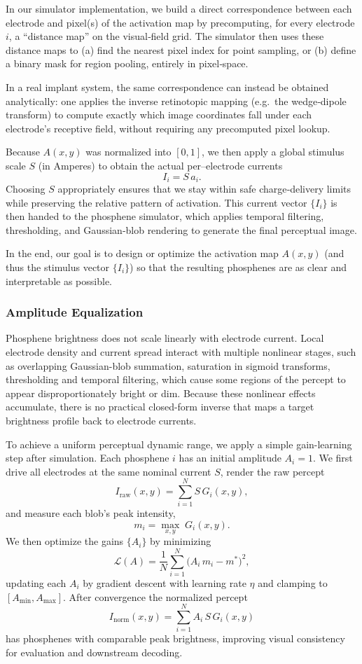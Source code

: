 In our simulator implementation, we build a direct correspondence between each electrode and pixel(s) of the activation map by precomputing, for every electrode \(i\), a “distance map” on the visual‐field grid.  The simulator then uses these distance maps to (a) find the nearest pixel index for point sampling, or (b) define a binary mask for region pooling, entirely in pixel‐space.  

In a real implant system, the same correspondence can instead be obtained analytically: one applies the inverse retinotopic mapping (e.g.\ the wedge‐dipole transform) to compute exactly which image coordinates fall under each electrode’s receptive field, without requiring any precomputed pixel lookup.

Because \(A(x,y)\) was normalized into \([0,1]\), we then apply a global stimulus scale \(S\) (in Amperes) to obtain the actual per–electrode currents
\[
  I_i = S\,a_i.
\]
Choosing \(S\) appropriately ensures that we stay within safe charge‐delivery limits while preserving the relative pattern of activation.  This current vector \(\{I_i\}\) is then handed to the phosphene simulator, which applies temporal filtering, thresholding, and Gaussian‐blob rendering to generate the final perceptual image.  

In the end, our goal is to design or optimize the activation map \(A(x,y)\) (and thus the stimulus vector \(\{I_i\}\)) so that the resulting phosphenes are as clear and interpretable as possible.




\subsubsection{Amplitude Equalization}
Phosphene brightness does not scale linearly with electrode current. Local electrode density and current spread interact with multiple nonlinear stages, such as overlapping Gaussian-blob summation, saturation in sigmoid transforms, thresholding and temporal filtering, which cause some regions of the percept to appear disproportionately bright or dim. Because these nonlinear effects accumulate, there is no practical closed-form inverse that maps a target brightness profile back to electrode currents.

To achieve a uniform perceptual dynamic range, we apply a simple gain-learning step after simulation. Each phosphene \(i\) has an initial amplitude \(A_i=1\). We first drive all electrodes at the same nominal current \(S\), render the raw percept
\[
I_{\mathrm{raw}}(x,y)
=
\sum_{i=1}^N S\,G_i(x,y),
\]
and measure each blob’s peak intensity,
\[
m_i = \max_{x,y}\;G_i(x,y).
\]
We then optimize the gains \(\{A_i\}\) by minimizing
\[
\mathcal{L}(A)
=
\frac{1}{N}\sum_{i=1}^N \bigl(A_i\,m_i - m^*\bigr)^2,
\]
updating each \(A_i\) by gradient descent with learning rate \(\eta\) and clamping to \([A_{\min},A_{\max}]\). After convergence the normalized percept
\[
I_{\mathrm{norm}}(x,y)
=
\sum_{i=1}^N A_i\,S\,G_i(x,y)
\]
has phosphenes with comparable peak brightness, improving visual consistency for evaluation and downstream decoding.

